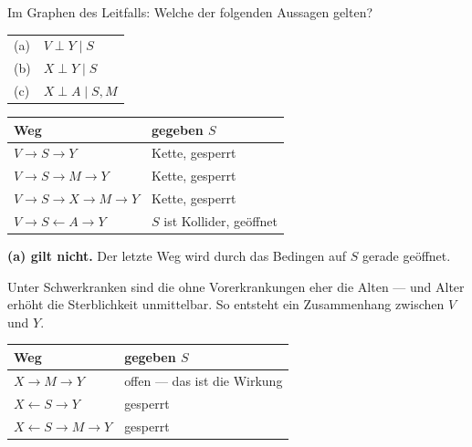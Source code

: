 \begin{aufgabe}
Im Graphen des Leitfalls: Welche der folgenden Aussagen gelten?
\begin{center}
{\small
\renewcommand{\arraystretch}{1.5}
\begin{tabular}{@{}P{1.0cm}P{7.4cm}@{}}
\toprule
(a) & $V \perp Y \mid S$\\
(b) & $X \perp Y \mid S$\\
(c) & $X \perp A \mid S, M$\\
\bottomrule
\end{tabular}}
\end{center}

\loesung
{}
\begin{center}
{\small
\renewcommand{\arraystretch}{1.46}
\begin{tabular}{@{}P{3.6cm}P{4.4cm}@{}}
\toprule
\textbf{Weg} & \textbf{gegeben $S$}\\
\midrule
$V \to S \to Y$ & Kette, gesperrt\\
$V \to S \to M \to Y$ & Kette, gesperrt\\
$V \to S \to X \to M \to Y$ & Kette, gesperrt\\
$V \to S \leftarrow A \to Y$ & $S$ ist Kollider, \textcolor{akzent}{geöffnet}\\
\bottomrule
\end{tabular}}
\end{center}

\begin{center}
\begin{minipage}{0.9\textwidth}
\textbf{(a) gilt nicht.} Der letzte Weg wird durch das Bedingen auf $S$ gerade geöffnet.
\end{minipage}
\end{center}

 Unter Schwerkranken sind die ohne Vorerkrankungen eher die Alten --- und Alter erhöht die Sterblichkeit unmittelbar. So entsteht ein Zusammenhang zwischen $V$ und $Y$.

\begin{center}
{\small
\renewcommand{\arraystretch}{1.46}
\begin{tabular}{@{}P{3.6cm}P{4.4cm}@{}}
\toprule
\textbf{Weg} & \textbf{gegeben $S$}\\
\midrule
$X \to M \to Y$ & \textcolor{akzent}{offen} --- das ist die Wirkung\\
$X \leftarrow S \to Y$ & gesperrt\\
$X \leftarrow S \to M \to Y$ & gesperrt\\
\bottomrule
\end{tabular}}
\end{center}


\end{aufgabe}
